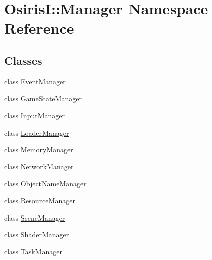 \hypertarget{namespace_osiris_i_1_1_manager}{\section{Osiris\-I\-:\-:Manager Namespace Reference}
\label{namespace_osiris_i_1_1_manager}
}
\subsection*{Classes}
\begin{DoxyCompactItemize}
\item 
class \hyperlink{class_osiris_i_1_1_manager_1_1_event_manager}{Event\-Manager}
\item 
class \hyperlink{class_osiris_i_1_1_manager_1_1_game_state_manager}{Game\-State\-Manager}
\item 
class \hyperlink{class_osiris_i_1_1_manager_1_1_input_manager}{Input\-Manager}
\item 
class \hyperlink{class_osiris_i_1_1_manager_1_1_loader_manager}{Loader\-Manager}
\item 
class \hyperlink{class_osiris_i_1_1_manager_1_1_memory_manager}{Memory\-Manager}
\item 
class \hyperlink{class_osiris_i_1_1_manager_1_1_network_manager}{Network\-Manager}
\item 
class \hyperlink{class_osiris_i_1_1_manager_1_1_object_name_manager}{Object\-Name\-Manager}
\item 
class \hyperlink{class_osiris_i_1_1_manager_1_1_resource_manager}{Resource\-Manager}
\item 
class \hyperlink{class_osiris_i_1_1_manager_1_1_scene_manager}{Scene\-Manager}
\item 
class \hyperlink{class_osiris_i_1_1_manager_1_1_shader_manager}{Shader\-Manager}
\item 
class \hyperlink{class_osiris_i_1_1_manager_1_1_task_manager}{Task\-Manager}
\end{DoxyCompactItemize}
